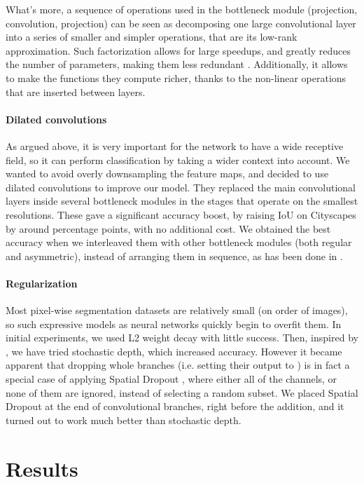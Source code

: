 \documentclass{article}
\begin{document}
What's more, a sequence of operations used in the bottleneck module (projection, convolution, projection) can be seen as decomposing one large convolutional layer into a series of smaller and simpler operations, that are its low-rank approximation.
Such factorization allows for large speedups, and greatly reduces the number of parameters, making them less redundant \cite{jin2014flattened}.
Additionally, it allows to make the functions they compute richer, thanks to the non-linear operations that are inserted between layers.

\paragraph{Dilated convolutions}
As argued above, it is very important for the network to have a wide receptive field, so it can perform classification by taking a wider context into account.
We wanted to avoid overly downsampling the feature maps, and decided to use dilated convolutions \cite{yu2015dilated} to improve our model.
They replaced the main convolutional layers inside several bottleneck modules in the stages that operate on the smallest resolutions.
These gave a significant accuracy boost, by raising IoU on Cityscapes by around  percentage points, with no additional cost.
We obtained the best accuracy when we interleaved them with other bottleneck modules (both regular and asymmetric), instead of arranging them in sequence, as has been done in \cite{yu2015dilated}.

\paragraph{Regularization}
Most pixel-wise segmentation datasets are relatively small (on order of  images), so such expressive models as neural networks quickly begin to overfit them.
In initial experiments, we used L2 weight decay with little success.
Then, inspired by \cite{huang2016stochastic}, we have tried stochastic depth, which increased accuracy.
However it became apparent that dropping whole branches (i.e. setting their output to ) is in fact a special case of applying Spatial Dropout \cite{tompson15}, where either all of the channels, or none of them are ignored, instead of selecting a random subset.
We placed Spatial Dropout at the end of convolutional branches, right before the addition, and it turned out to work much better than stochastic depth.

\section{Results} \label{results}
\end{document}
